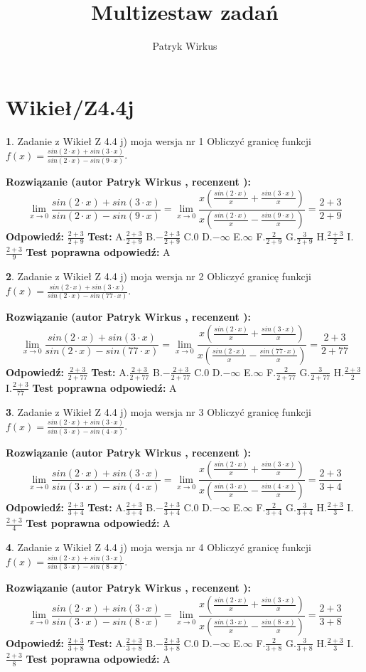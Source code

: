 \documentclass[12pt, a4paper]{article}
\title{Multizestaw zadań}
\author{Patryk Wirkus}
\date{}
\theoremstyle{definition} %
\newtheorem{zad}{}
\newcommand{\kategoria}[1]{\section{#1}}
\newcommand{\zadStart}[1]{\begin{zad}#1\newline}
\newcommand{\zadStop}{\end{zad}}
\newcommand{\rozwStart}[2]{\noindent \textbf{Rozwiązanie (autor #1 , recenzent #2): }\newline}
\newcommand{\rozwStop}{\newline}
\newcommand{\odpStart}{\noindent \textbf{Odpowiedź:}\newline}
\newcommand{\odpStop}{\newline}
\newcommand{\testStart}{\noindent \textbf{Test:}\newline}
\newcommand{\testStop}{\newline}
\newcommand{\kluczStart}{\noindent \textbf{Test poprawna odpowiedź:}\newline}
\newcommand{\kluczStop}{\newline}
\begin{document}
\maketitle

\kategoria{Wikieł/Z4.4j}


\zadStart{Zadanie z Wikieł Z 4.4 j) moja wersja nr 1}
Obliczyć granicę funkcji $f(x)=\frac{sin(2\cdot x) +sin(3\cdot x)}{sin(2\cdot x) -sin(9\cdot x)}$.
\zadStop
\rozwStart{Patryk Wirkus}{}
$$\lim\limits_{x\to 0}\frac{sin(2\cdot x) +sin(3\cdot x)}{sin(2\cdot x) -sin(9\cdot x)}=\lim\limits_{x\to 0}\frac{x(\frac{sin(2\cdot x)}{x}+\frac{sin(3\cdot x)}{x})}{x(\frac{sin(2\cdot x)}{x}-\frac{sin(9\cdot x)}{x})}=\frac{2+3}{2+9}$$
\rozwStop
\odpStart
$\frac{2+3}{2+9}$
\odpStop
\testStart
A.$\frac{2+3}{2+9}$
B.$-\frac{2+3}{2+9}$
C.$0$
D.$-\infty$
E.$\infty$
F.$\frac{2}{2+9}$
G.$\frac{3}{2+9}$
H.$\frac{2+3}{2}$
I.$\frac{2+3}{9}$
\testStop
\kluczStart
A
\kluczStop



\zadStart{Zadanie z Wikieł Z 4.4 j) moja wersja nr 2}
Obliczyć granicę funkcji $f(x)=\frac{sin(2\cdot x) +sin(3\cdot x)}{sin(2\cdot x) -sin(77\cdot x)}$.
\zadStop
\rozwStart{Patryk Wirkus}{}
$$\lim\limits_{x\to 0}\frac{sin(2\cdot x) +sin(3\cdot x)}{sin(2\cdot x) -sin(77\cdot x)}=\lim\limits_{x\to 0}\frac{x(\frac{sin(2\cdot x)}{x}+\frac{sin(3\cdot x)}{x})}{x(\frac{sin(2\cdot x)}{x}-\frac{sin(77\cdot x)}{x})}=\frac{2+3}{2+77}$$
\rozwStop
\odpStart
$\frac{2+3}{2+77}$
\odpStop
\testStart
A.$\frac{2+3}{2+77}$
B.$-\frac{2+3}{2+77}$
C.$0$
D.$-\infty$
E.$\infty$
F.$\frac{2}{2+77}$
G.$\frac{3}{2+77}$
H.$\frac{2+3}{2}$
I.$\frac{2+3}{77}$
\testStop
\kluczStart
A
\kluczStop



\zadStart{Zadanie z Wikieł Z 4.4 j) moja wersja nr 3}
Obliczyć granicę funkcji $f(x)=\frac{sin(2\cdot x) +sin(3\cdot x)}{sin(3\cdot x) -sin(4\cdot x)}$.
\zadStop
\rozwStart{Patryk Wirkus}{}
$$\lim\limits_{x\to 0}\frac{sin(2\cdot x) +sin(3\cdot x)}{sin(3\cdot x) -sin(4\cdot x)}=\lim\limits_{x\to 0}\frac{x(\frac{sin(2\cdot x)}{x}+\frac{sin(3\cdot x)}{x})}{x(\frac{sin(3\cdot x)}{x}-\frac{sin(4\cdot x)}{x})}=\frac{2+3}{3+4}$$
\rozwStop
\odpStart
$\frac{2+3}{3+4}$
\odpStop
\testStart
A.$\frac{2+3}{3+4}$
B.$-\frac{2+3}{3+4}$
C.$0$
D.$-\infty$
E.$\infty$
F.$\frac{2}{3+4}$
G.$\frac{3}{3+4}$
H.$\frac{2+3}{3}$
I.$\frac{2+3}{4}$
\testStop
\kluczStart
A
\kluczStop



\zadStart{Zadanie z Wikieł Z 4.4 j) moja wersja nr 4}
Obliczyć granicę funkcji $f(x)=\frac{sin(2\cdot x) +sin(3\cdot x)}{sin(3\cdot x) -sin(8\cdot x)}$.
\zadStop
\rozwStart{Patryk Wirkus}{}
$$\lim\limits_{x\to 0}\frac{sin(2\cdot x) +sin(3\cdot x)}{sin(3\cdot x) -sin(8\cdot x)}=\lim\limits_{x\to 0}\frac{x(\frac{sin(2\cdot x)}{x}+\frac{sin(3\cdot x)}{x})}{x(\frac{sin(3\cdot x)}{x}-\frac{sin(8\cdot x)}{x})}=\frac{2+3}{3+8}$$
\rozwStop
\odpStart
$\frac{2+3}{3+8}$
\odpStop
\testStart
A.$\frac{2+3}{3+8}$
B.$-\frac{2+3}{3+8}$
C.$0$
D.$-\infty$
E.$\infty$
F.$\frac{2}{3+8}$
G.$\frac{3}{3+8}$
H.$\frac{2+3}{3}$
I.$\frac{2+3}{8}$
\testStop
\kluczStart
A
\kluczStop
\end{document}
